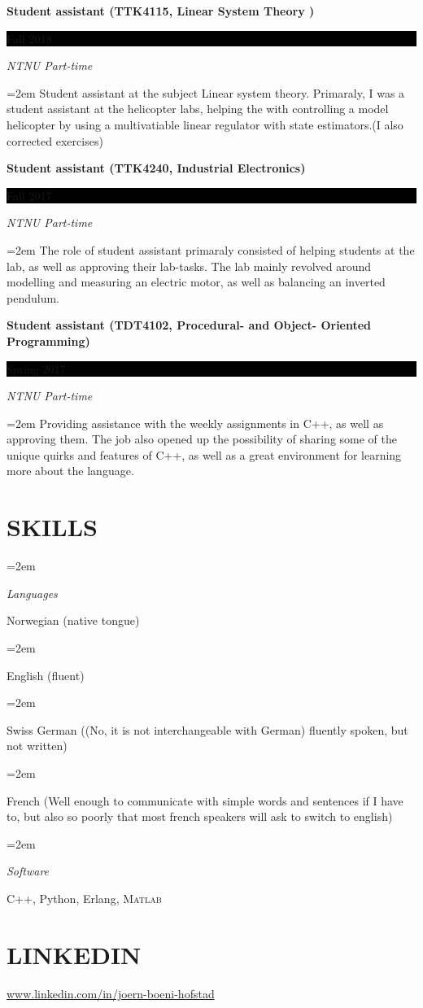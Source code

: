 \documentclass[paper=a4,fontsize=11pt,norsk]{scrartcl} %
\newlength{\spacebox}
\newcommand{\NewPart}[1]{\section*{\uppercase{#1}}}
\newcommand{\PersonalEntry}[2]{
		\noindent\hangindent=2em\hangafter=0 %
		\parbox{\spacebox}{        %
		\textit{#1}}		       %
		\hspace{1.5em} #2 \par}    %
\newcommand{\SkillsEntry}[2]{      %
		\noindent\hangindent=2em\hangafter=0 %
		\parbox{\spacebox}{        %
		\textit{#1}}			   %
		\hspace{1.5em} #2 \par}    %
\newcommand{\EducationEntry}[4]{
		\noindent \textbf{#1} \hfill      %
		\colorbox{Black}{%
			\parbox{6em}{%
			\hfill\color{White}#2}} \par  %
		\noindent \textit{#3} \par        %
		\noindent\hangindent=2em\hangafter=0 \small #4 %
		\normalsize \par}
\begin{document}
\EducationEntry{Student assistant (TTK4115, Linear System Theory )}{Fall 2018}{NTNU Part-time}
{Student assistant at the subject Linear system theory. Primaraly, I was a student assistant at the helicopter labs, helping the with controlling a model helicopter by using a multivatiable linear regulator with state estimators.(I also corrected exercises) 
}
\EducationEntry{Student assistant (TTK4240, Industrial Electronics)}{Fall 2017}{NTNU Part-time}
{The role of student assistant primaraly consisted of helping students at the lab, as well as approving their lab-tasks. 
The lab mainly revolved around modelling and measuring an electric motor, as well as balancing an inverted pendulum.
}

\EducationEntry{Student assistant (TDT4102, Procedural- and Object- Oriented     Programming)}{Spring 2017}{NTNU Part-time}
{Providing assistance with the weekly assignments in C++, as well as approving them. The job also opened up the possibility of sharing some of the unique quirks and features of C++, as well as a great environment for learning more about the language.
}
\NewPart{Skills}{}

\SkillsEntry{Languages}{Norwegian (native tongue)}
\SkillsEntry{}{English (fluent)}
\SkillsEntry{}{Swiss German  ((No, it is not interchangeable with German) fluently spoken, but not  written)}
\SkillsEntry{}{French (Well enough to communicate with simple words and sentences if I have to, but also so poorly that most french speakers will ask to switch to english)}

\SkillsEntry{Software}{  C++, Python, Erlang, \textsc{Matlab}}



\NewPart{Linkedin}{
\url{www.linkedin.com/in/joern-boeni-hofstad}
}
\end{document}

